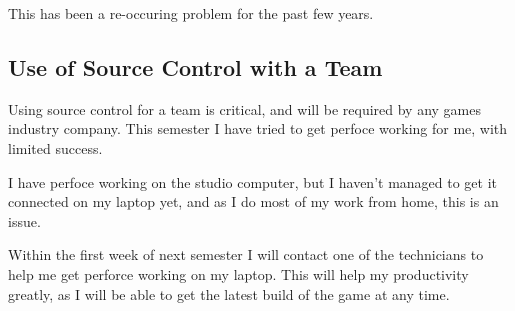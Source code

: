 \documentclass{scrartcl}
\begin{document}
\par





This has been a re-occuring problem for the past few years.


\par




\subsection{Use of Source Control with a Team}

Using source control for a team is critical, and will be required by any games industry company.
This semester I have tried to get perfoce working for me, with limited success.

I have perfoce working on the studio computer, but I haven't managed to get it connected on my laptop yet, and as I do most of my work from home, this is an issue.


Within the first week of next semester I will contact one of the technicians to help me get perforce working on my laptop. This will help my productivity greatly, as I will be able to get the latest build of the game at any time.

\par






%
\end{document}
